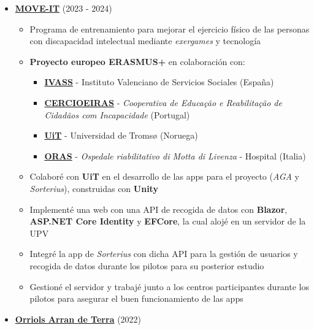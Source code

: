 \documentclass[letterpaper, 12pt, dvipsnames]{article}
\begin{document}
\vspace{1em}

\begin{itemize}
    \item {\large\textbf{\href{https://moveit.webs.upv.es/es/}{MOVE-IT}}} (2023 - 2024)
          \begin{itemize}
              \item Programa de entrenamiento para mejorar el ejercicio físico de las personas con discapacidad intelectual mediante \textit{exergames} y tecnología
              \item \textbf{Proyecto europeo ERASMUS+} en colaboración con:
                    \begin{itemize}
                        \item \textbf{\href{https://www.ivass.gva.es/}{IVASS}} - Instituto Valenciano de Servicios Sociales (España)
                        \item \textbf{\href{https://www.cercioeiras.pt/pt}{CERCIOEIRAS}} - \textit{Cooperativa de Educação e Reabilitação de Cidadãos com Incapacidade} (Portugal)
                        \item \textbf{\href{https://en.uit.no/}{UiT}} - Universidad de Tromsø (Noruega)
                        \item \textbf{\href{https://www.ospedalemotta.it/it/}{ORAS}} - \textit{Ospedale riabilitativo di Motta di Livenza} - Hospital (Italia)
                    \end{itemize}
              \item Colaboré con \textbf{UiT} en el desarrollo de las apps para el proyecto (\textit{AGA} y \textit{Sorterius}), construidas con \textbf{Unity}
              \item Implementé una web con una API de recogida de datos con \textbf{Blazor}, \textbf{ASP.NET Core Identity} y \textbf{EFCore}, la cual alojé en un servidor de la UPV
              \item Integré la app de \textit{Sorterius} con dicha API para la gestión de usuarios y recogida de datos durante los pilotos para su posterior estudio
              \item Gestioné el servidor y trabajé junto a los centros participantes durante los pilotos para asegurar el buen funcionamiento de las apps
          \end{itemize}
    \item {\large\textbf{\href{https://orriolsarrandeterra.com/}{Orriols Arran de Terra}}} (2022)
          \begin{itemize}

\end{itemize}
\end{itemize}
\end{document}

